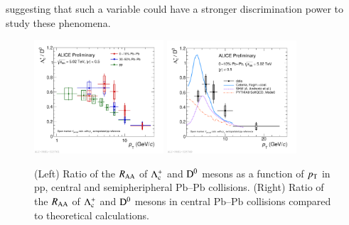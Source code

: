 \documentclass[3p,times,procedia]{elsarticle}
\newcommand{\PbPb}{\mbox{Pb--Pb}}
\newcommand{\pt}{p_{\rm T}}
\newcommand{\Dzero}{{\rm D^0}}
\newcommand{\Lc}{{\rm \Lambda_{c}^+}}
\newcommand{\RAA}{R_{\rm AA}}
\begin{document}
suggesting that such a variable could have a stronger discrimination power to study
these phenomena.  
\begin{figure}[h]
\includegraphics[width=0.43\textwidth]{Plots/PbPbLc/2019-10-28-LcD_PbPb18_010_3050_pp_Logx_shift.pdf}
\includegraphics[width=0.43\textwidth]{Plots/PbPbLc/2019-10-31-LcD_PbPb18_010_theory_withPythia.pdf}
\caption{
	(Left) Ratio of the $\RAA$ of $\Lc$ and $\Dzero$ mesons as a function of $\pt$ in pp, central and semipheripheral $\PbPb$ collisions. 
	(Right) Ratio of the $\RAA$ of $\Lc$ and $\Dzero$ mesons in central $\PbPb$ collisions compared to theoretical calculations.}
\label{fig:LcD0andtheory}
\end{figure}
\end{document}
